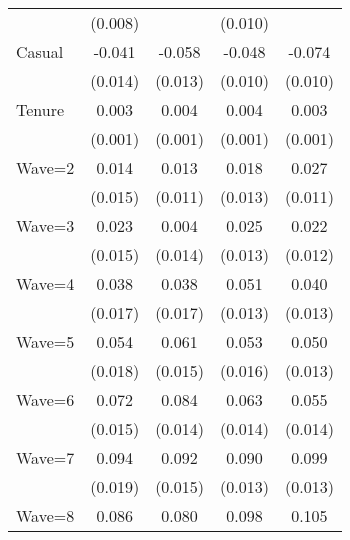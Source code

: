 {\begin{tabular}{l*{4}{c}}
                    &     (0.008)         &                     &     (0.010)         &                     \\
Casual              &      -0.041\sym{***}&      -0.058\sym{***}&      -0.048\sym{***}&      -0.074\sym{***}\\
                    &     (0.014)         &     (0.013)         &     (0.010)         &     (0.010)         \\
Tenure              &       0.003\sym{***}&       0.004\sym{***}&       0.004\sym{***}&       0.003\sym{***}\\
                    &     (0.001)         &     (0.001)         &     (0.001)         &     (0.001)         \\
Wave=2              &       0.014         &       0.013         &       0.018         &       0.027\sym{**} \\
                    &     (0.015)         &     (0.011)         &     (0.013)         &     (0.011)         \\
Wave=3              &       0.023         &       0.004         &       0.025\sym{*}  &       0.022\sym{*}  \\
                    &     (0.015)         &     (0.014)         &     (0.013)         &     (0.012)         \\
Wave=4              &       0.038\sym{**} &       0.038\sym{**} &       0.051\sym{***}&       0.040\sym{***}\\
                    &     (0.017)         &     (0.017)         &     (0.013)         &     (0.013)         \\
Wave=5              &       0.054\sym{***}&       0.061\sym{***}&       0.053\sym{***}&       0.050\sym{***}\\
                    &     (0.018)         &     (0.015)         &     (0.016)         &     (0.013)         \\
Wave=6              &       0.072\sym{***}&       0.084\sym{***}&       0.063\sym{***}&       0.055\sym{***}\\
                    &     (0.015)         &     (0.014)         &     (0.014)         &     (0.014)         \\
Wave=7              &       0.094\sym{***}&       0.092\sym{***}&       0.090\sym{***}&       0.099\sym{***}\\
                    &     (0.019)         &     (0.015)         &     (0.013)         &     (0.013)         \\
Wave=8              &       0.086\sym{***}&       0.080\sym{***}&       0.098\sym{***}&       0.105\sym{***}\\

\end{tabular}}
